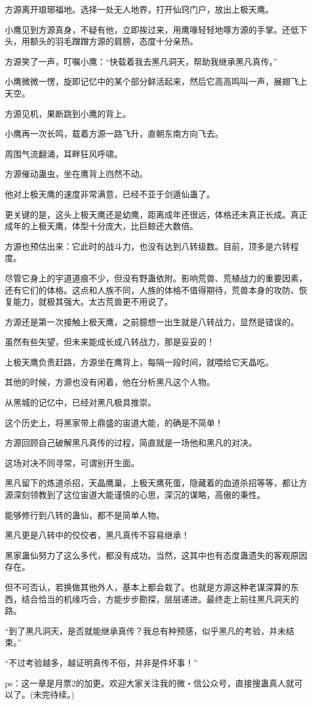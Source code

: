 \begin{this_body}
方源离开琅琊福地。选择一处无人地界，打开仙窍门户，放出上极天鹰。

小鹰见到方源真身，不疑有他，立即挨过来，用鹰喙轻轻地啄方源的手掌。还低下头，用额头的羽毛蹭蹭方源的肩膀，态度十分亲热。

方源笑了一声，叮嘱小鹰：“快载着我去黑凡洞天，帮助我继承黑凡真传。”

小鹰微微一愣，旋即记忆中的某个部分鲜活起来，然后它高高鸣叫一声，展翅飞上天空。

方源见机，果断跳到小鹰的背上。

小鹰再一次长鸣，载着方源一路飞升，直朝东南方向飞去。

周围气流翻涌，耳畔狂风呼啸。

方源催动蛊虫，坐在鹰背上岿然不动。

他对上极天鹰的速度非常满意，已经不亚于剑遁仙蛊了。

更关键的是，这头上极天鹰还是幼鹰，距离成年还很远，体格还未真正长成。真正成年的上极天鹰，体型十分庞大，比巨鲸还大数倍。

方源也预估出来：它此时的战斗力，也没有达到八转级数。目前，顶多是六转程度。

尽管它身上的宇道道痕不少，但没有野蛊依附。影响荒兽、荒植战力的重要因素，还有它们的体格。这点和人族不同，人族的体格不值得期待，荒兽本身的攻防、恢复能力，就极其强大。太古荒兽更不用说了。

方源还是第一次接触上极天鹰，之前臆想一出生就是八转战力，显然是错误的。

虽然有些失望，但未来能成长成八转战力，那是妥妥的！

上极天鹰负责赶路，方源坐在鹰背上，每隔一段时间，就喂给它天晶吃。

其他的时候，方源也没有闲着，他在分析黑凡这个人物。

从黑城的记忆中，已经对黑凡极具推崇。

这个历史上，将黑家带上鼎盛的宙道大能，的确是不简单！

方源回顾自己破解黑凡真传的过程，简直就是一场他和黑凡的对决。

这场对决不同寻常，可谓别开生面。

黑凡留下的炼道杀招，天晶鹰巢，上极天鹰死蛋，隐藏着的血道杀招等等，都让方源深刻领教到了这位宙道大能谨慎的心思，深沉的谋略，高傲的秉性。

能够修行到八转的蛊仙，都不是简单人物。

黑凡更是八转中的佼佼者，黑凡真传不容易继承！

黑家蛊仙努力了这么多代，都没有成功。当然，这其中也有态度蛊遗失的客观原因存在。

但不可否认，若换做其他外人，基本上都会栽了。也就是方源这种老谋深算的东西，结合恰当的机缘巧合，方能步步勘探，层层递进。最终走上前往黑凡洞天的路。

“到了黑凡洞天，是否就能继承真传？我总有种预感，似乎黑凡的考验，并未结束。”

“不过考验越多，越证明真传不俗，并非是件坏事！”

ps：这一章是月票2的加更。欢迎大家关注我的微・信公众号，直接搜蛊真人就可以了。(未完待续。)

\end{this_body}

